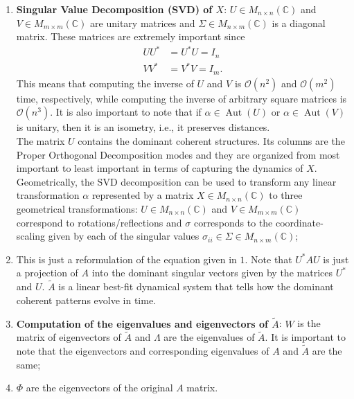 \documentclass[]{article}
\DeclareMathOperator{\Aut}{Aut}
\begin{document}
\begin{enumerate}
	\item \textbf{Singular Value Decomposition (SVD) of $X$}: $U \in M_{n \times n}(\mathbb{C})$ and $V \in M_{m \times m}(\mathbb{C})$ are unitary matrices and $\Sigma \in M_{n \times m}(\mathbb{C})$ is a diagonal matrix. These matrices are extremely important since 
	\begin{equation}
		\begin{split}
			UU^*&=U^*U=I_n \\ 
			VV^*&=V^*V=I_m.
		\end{split}
	\end{equation}
	This means that computing the inverse of $U$ and $V$ is $\mathcal{O}(n^2)$ and $\mathcal{O}(m^2)$ time, respectively, while computing the inverse of arbitrary square matrices is $\mathcal{O}(n^3)$.
	It is also important to note that if $\alpha \in \Aut(U)$ or $\alpha \in \Aut(V)$ is unitary, then it is an isometry, i.e., it preserves distances. \\
	The matrix $U$ contains the dominant coherent structures. Its columns are the Proper Orthogonal Decomposition modes and they are organized from most important to least important in terms of capturing the dynamics of $X$. \\
	Geometrically, the SVD decomposition can be used to transform any linear transformation $\alpha$ represented by a matrix $X \in M_{n \times n}(\mathbb{C})$ to three geometrical transformations: $U \in M_{n \times n}(\mathbb{C})$ and $V \in M_{m \times m}(\mathbb{C})$ correspond to rotations/reflections and $\sigma$ corresponds to the coordinate-scaling given by each of the singular values $\sigma_{ii} \in \Sigma \in M_{n \times m}(\mathbb{C})$;
	\item This is just a reformulation of the equation given in $1.$ Note that $U^* A U$	is just a projection of $A$ into the dominant singular vectors given by the matrices $U^*$ and $U$. $\tilde{A}$ is a linear best-fit dynamical system that tells how the dominant coherent patterns evolve in time.
	\item \textbf{Computation of the eigenvalues and eigenvectors of $\tilde{A}$}: $W$ is the matrix of eigenvectors of $\tilde{A}$ and $\Lambda$ are the eigenvalues of $\tilde{A}$. It is important to note that the eigenvectors and corresponding eigenvalues of $A$ and $\tilde{A}$ are the same;
	\item $\Phi$ are the eigenvectors of the original $A$ matrix.
	
\end{enumerate}
\end{document}
